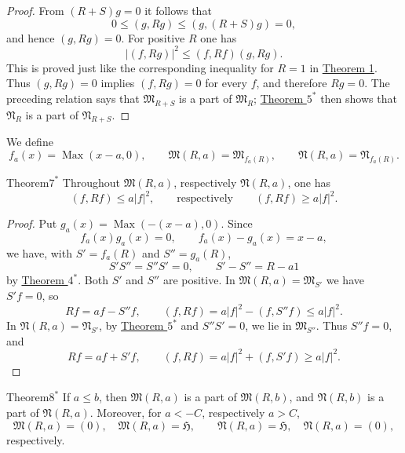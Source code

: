 ﻿\documentclass[paper=b5,fontsize=13pt,bookmarkpackage=false,twoside]{scrartcl}
\begin{document}
\begin{proof}
From \((R+S)g=0\) it follows that
\[
  0\leq(g,Rg)\leq(g,(R+S)g)=0,
\]
and hence \((g,Rg)=0\).  For positive \(R\) one has
\[
  |(f,Rg)|^2\leq(f,Rf)(g,Rg).
\]
This is proved just like the corresponding inequality for \(R=1\) in
\hyperref[thm:1]{Theorem 1}.  Thus \((g,Rg)=0\) implies
\((f,Rg)=0\) for every \(f\), and therefore \(Rg=0\).  The preceding
relation says that \(\mathfrak M_{R+S}\) is a part of
\(\mathfrak M_R\); \hyperref[thm:appII-5]{Theorem \(5^*\)} then shows
that \(\mathfrak N_R\) is a part of \(\mathfrak N_{R+S}\).
\end{proof}

We define
\[
  f_a(x)=\operatorname{Max}(x-a,0),\qquad
  \mathfrak M(R,a)=\mathfrak M_{f_a(R)},\qquad
  \mathfrak N(R,a)=\mathfrak N_{f_a(R)}.
\]

\begin{namedstatement}{Theorem}{\(7^*\)}
\label{thm:appII-7}
Throughout \(\mathfrak M(R,a)\), respectively \(\mathfrak N(R,a)\),
one has
\[
  (f,Rf)\leq a|f|^2,
  \qquad\text{respectively}\qquad
  (f,Rf)\geq a|f|^2.
\]
\end{namedstatement}

\begin{proof}
Put \(g_a(x)=\operatorname{Max}(-(x-a),0)\).  Since
\[
  f_a(x)g_a(x)=0,\qquad f_a(x)-g_a(x)=x-a,
\]
we have, with \(S'=f_a(R)\) and \(S''=g_a(R)\),
\[
  S'S''=S''S'=0,\qquad S'-S''=R-a1
\]
by \hyperref[thm:appII-4]{Theorem \(4^*\)}.  Both \(S'\) and \(S''\)
are positive.  In
\(\mathfrak M(R,a)=\mathfrak M_{S'}\) we have \(S'f=0\), so
\[
  Rf=af-S''f,\qquad
  (f,Rf)=a|f|^2-(f,S''f)\leq a|f|^2.
\]
In \(\mathfrak N(R,a)=\mathfrak N_{S'}\), by
\hyperref[thm:appII-5]{Theorem \(5^*\)} and \(S''S'=0\), we lie in
\(\mathfrak M_{S''}\).  Thus \(S''f=0\), and
\[
  Rf=af+S'f,\qquad
  (f,Rf)=a|f|^2+(f,S'f)\geq a|f|^2.
\]
\end{proof}

\begin{namedstatement}{Theorem}{\(8^*\)}
\label{thm:appII-8}
If \(a\leq b\), then \(\mathfrak M(R,a)\) is a part of
\(\mathfrak M(R,b)\), and \(\mathfrak N(R,b)\) is a part of
\(\mathfrak N(R,a)\).  Moreover, for \(a<-C\), respectively \(a>C\),
\[
  \mathfrak M(R,a)=(0),\quad \mathfrak M(R,a)=\mathfrak H,
  \qquad
  \mathfrak N(R,a)=\mathfrak H,\quad \mathfrak N(R,a)=(0),
\]
respectively.
\end{namedstatement}
\end{document}
